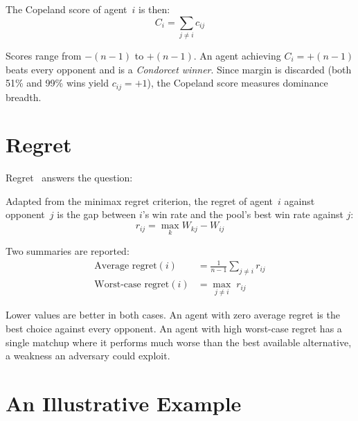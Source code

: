 The Copeland score of agent~$i$ is then:
\begin{equation}
    C_i = \sum_{j \neq i} c_{ij}
\end{equation}

Scores range from $-(n-1)$ to $+(n-1)$. An agent achieving $C_i = +(n-1)$ beats every opponent and is a \emph{Condorcet winner}. Since margin is discarded (both 51\% and 99\% wins yield $c_{ij} = +1$), the Copeland score measures dominance breadth.

\section{Regret}
\label{app:regret-impl}

Regret~\cite{savageTheoryStatisticalDecision1951} answers the question: 

\medskip

Adapted from the minimax regret criterion, the regret of agent~$i$ against opponent~$j$ is the gap between $i$'s win rate and the pool's best win rate against $j$:
\begin{equation}
    r_{ij} = \max_{k} W_{kj} - W_{ij}
\end{equation}

Two summaries are reported:
\begin{align}
    \text{Average regret}(i)    &= \frac{1}{n-1} \sum_{j \neq i} r_{ij} \\
    \text{Worst-case regret}(i) &= \max_{j \neq i} \; r_{ij}
\end{align}

Lower values are better in both cases. An agent with zero average regret is the best choice against every opponent. An agent with high worst-case regret has a single matchup where it performs much worse than the best available alternative, a weakness an adversary could exploit.

\section{An Illustrative Example}
\label{sec:illustrative-example}

